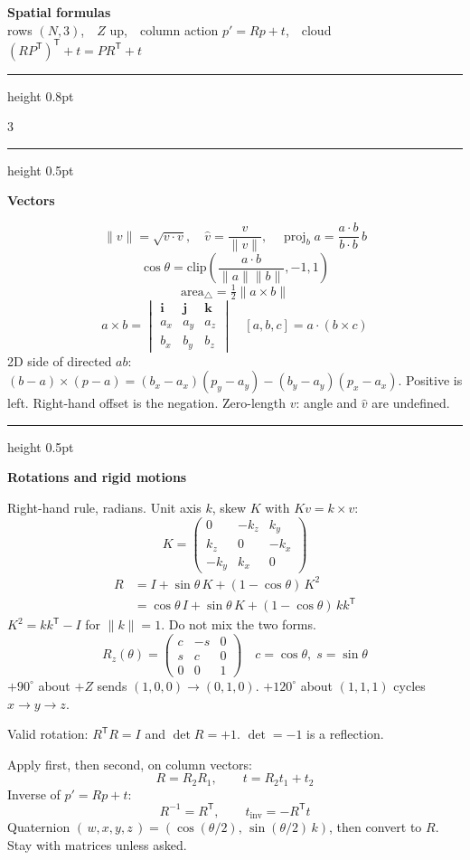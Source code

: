 \documentclass[8pt]{extarticle}
\newcommand{\sect}[1]{%
  \par\vspace{1.5pt}%
  {\color{navy}\hrule height 0.5pt}\par\vspace{0.7pt}%
  {\sffamily\bfseries\color{navy}#1}\par\vspace{0.2pt}%
}
\begin{document}
\color{ink}
\begin{center}
  {\sffamily\bfseries\Large\color{navy} Spatial formulas}\\[0.5pt]
  {\sffamily\small\color{navy} rows $(N,3)$,\ \ $Z$ up,\ \ column action $p'=Rp+t$,\ \ cloud $(RP^{\mathsf T})^{\mathsf T}+t=PR^{\mathsf T}+t$}%
\end{center}
\vspace{-2pt}
{\color{rule}\hrule height 0.8pt}

\begin{multicols}{3}

\sect{Vectors}
\[
\|v\|=\sqrt{v\cdot v},\quad
\hat v=\frac{v}{\|v\|},\quad
\operatorname{proj}_{b}a=\frac{a\cdot b}{b\cdot b}\,b
\]
\[
\cos\theta=\mathrm{clip}\!\left(\frac{a\cdot b}{\|a\|\|b\|},-1,1\right)
\]
\[
\text{area}_{\triangle}=\tfrac12\|a\times b\|
\]
\[
a\times b=
\begin{vmatrix}
\mathbf i&\mathbf j&\mathbf k\\
a_x&a_y&a_z\\
b_x&b_y&b_z
\end{vmatrix}
\quad
[a,b,c]=a\cdot(b\times c)
\]
2D side of directed $ab$: $(b-a)\times(p-a)=(b_x-a_x)(p_y-a_y)-(b_y-a_y)(p_x-a_x)$.
Positive is left. Right-hand offset is the negation.
Zero-length $v$: angle and $\hat v$ are undefined.

\sect{Rotations and rigid motions}
Right-hand rule, radians. Unit axis $k$, skew $K$ with $Kv=k\times v$:
\[
K=\begin{pmatrix}0&-k_z&k_y\\ k_z&0&-k_x\\ -k_y&k_x&0\end{pmatrix}
\]
\begin{align*}
R&=I+\sin\theta\,K+(1-\cos\theta)\,K^{2}\\
&=\cos\theta\,I+\sin\theta\,K+(1-\cos\theta)\,kk^{\mathsf T}
\end{align*}
$K^{2}=kk^{\mathsf T}-I$ for $\|k\|=1$. Do not mix the two forms.
\[
R_z(\theta)=\begin{pmatrix}c&-s&0\\ s&c&0\\ 0&0&1\end{pmatrix}
\quad
c=\cos\theta,\; s=\sin\theta
\]
$+90^{\circ}$ about $+Z$ sends $(1,0,0)\to(0,1,0)$.
$+120^{\circ}$ about $(1,1,1)$ cycles $x\to y\to z$.

Valid rotation: $R^{\mathsf T}R=I$ and $\det R=+1$. $\det=-1$ is a reflection.

Apply first, then second, on column vectors:
\[
R=R_2R_1,\qquad t=R_2 t_1+t_2
\]
Inverse of $p'=Rp+t$:
\[
R^{-1}=R^{\mathsf T},\qquad t_{\mathrm{inv}}=-R^{\mathsf T}t
\]
Quaternion $(\,w,x,y,z\,)=(\cos(\theta/2),\,\sin(\theta/2)\,k)$, then convert to $R$. Stay with matrices unless asked.


\end{multicols}
\end{document}
